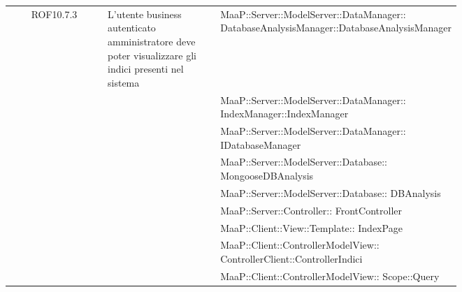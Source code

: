 \begin{center}
\begin{longtable}{|c|p{0.25\linewidth}|p{0.5\linewidth}|}
\midrule
ROF10.7.3
& L'utente business autenticato amministratore deve poter visualizzare gli indici presenti nel sistema
& MaaP::Server::ModelServer::DataManager:: DatabaseAnalysisManager::DatabaseAnalysisManager\\
& & MaaP::Server::ModelServer::DataManager:: IndexManager::IndexManager\\
& & MaaP::Server::ModelServer::DataManager:: IDatabaseManager\\
& & MaaP::Server::ModelServer::Database:: MongooseDBAnalysis\\
& & MaaP::Server::ModelServer::Database:: DBAnalysis\\
& & MaaP::Server::Controller:: FrontController\\
& & MaaP::Client::View::Template:: IndexPage\\
& & MaaP::Client::ControllerModelView:: ControllerClient::ControllerIndici\\
& & MaaP::Client::ControllerModelView:: Scope::Query\\

\end{longtable}
\end{center}
